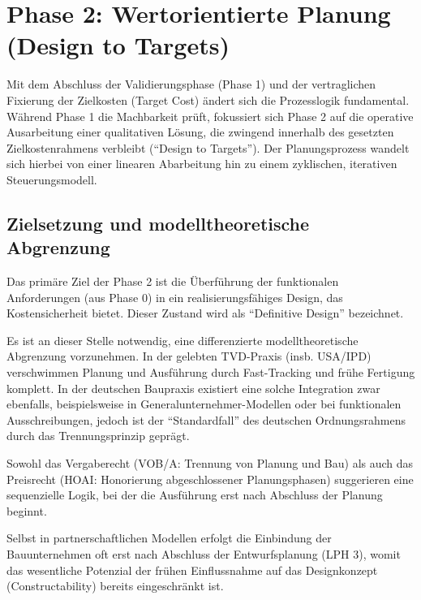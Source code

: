 \clearpage

\section{Phase 2: Wertorientierte Planung (Design to Targets)}
\label{sec:4.4}

Mit dem Abschluss der Validierungsphase (Phase 1) und der vertraglichen Fixierung der Zielkosten (Target Cost) ändert sich die Prozesslogik fundamental. Während Phase 1 die Machbarkeit prüft, fokussiert sich Phase 2 auf die operative Ausarbeitung einer qualitativen Lösung, die zwingend innerhalb des gesetzten Zielkostenrahmens verbleibt (\enquote{Design to Targets}).
Der Planungsprozess wandelt sich hierbei von einer linearen Abarbeitung hin zu einem zyklischen, iterativen Steuerungsmodell.

\subsection{Zielsetzung und modelltheoretische Abgrenzung}
\label{sec:4.4.1}
Das primäre Ziel der Phase 2 ist die Überführung der funktionalen Anforderungen (aus Phase 0) in ein realisierungsfähiges Design, das Kostensicherheit bietet. Dieser Zustand wird als \enquote{Definitive Design} bezeichnet.

Es ist an dieser Stelle notwendig, eine differenzierte modelltheoretische Abgrenzung vorzunehmen. In der gelebten \acs{TVD}-Praxis (insb. USA/\acs{IPD}) verschwimmen Planung und Ausführung durch Fast-Tracking und frühe Fertigung komplett. In der deutschen Baupraxis existiert eine solche Integration zwar ebenfalls, beispielsweise in Generalunternehmer-Modellen oder bei funktionalen Ausschreibungen, jedoch ist der \enquote{Standardfall} des deutschen Ordnungsrahmens durch das Trennungsprinzip geprägt.

Sowohl das Vergaberecht (\acs{VOB}/A: Trennung von Planung und Bau) als auch das Preisrecht (\acs{HOAI}: Honorierung abgeschlossener Planungsphasen) suggerieren eine sequenzielle Logik, bei der die Ausführung erst nach Abschluss der Planung beginnt.\autocite[Vgl.][§~7]{springer_fachmedien_wiesbaden_vob2019_2020}\, \autocite[Vgl.][§~34 i.\,V.\,m.~Anl.~10]{hoai_honorarordnung_2021}


 Selbst in partnerschaftlichen Modellen erfolgt die Einbindung der Bauunternehmen oft erst nach Abschluss der Entwurfsplanung (\acs{LPH} 3), womit das wesentliche Potenzial der frühen Einflussnahme auf das Designkonzept (Constructability) bereits eingeschränkt ist.\autocite[Vgl.][S.~4--6]{ballard_target_2012}


